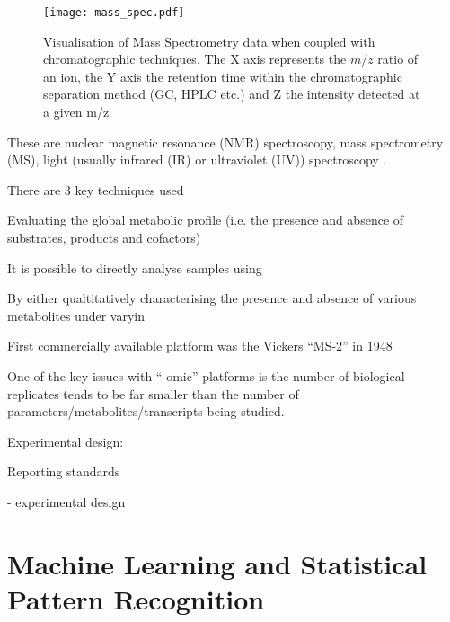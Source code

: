 \begin{figure}
    \texttt{[image: mass\_spec.pdf]}
    \caption[Mass Spectrometry Data]{Visualisation of Mass Spectrometry data when coupled with chromatographic techniques.
        The X axis represents the \(m/z\) ratio of an ion, the Y axis the retention time within the chromatographic
    separation method (GC, HPLC etc.) and Z the intensity detected at a given m/z}
    \label{fig:mass_spec}
\end{figure}






These are nuclear magnetic resonance (NMR) spectroscopy, mass spectrometry (MS), 
light (usually infrared (IR) or ultraviolet (UV)) spectroscopy \citep{Kafsack2010}.







There are 3 key techniques used




Evaluating the global metabolic profile (i.e. the presence and absence of 
substrates, products and cofactors) 



It is possible to directly analyse samples using 





By either qualtitatively characterising the presence and absence of various
metabolites under varyin





First commercially available platform was the Vickers ``MS-2'' in 1948





One of the key issues with ``-omic'' platforms is the number of biological replicates 
tends to be far smaller than the number of parameters/metabolites/transcripts being
studied. 


Experimental design: 




Reporting standards \citep{Goodacre2007}

- experimental design



\section{Machine Learning and Statistical Pattern Recognition}


